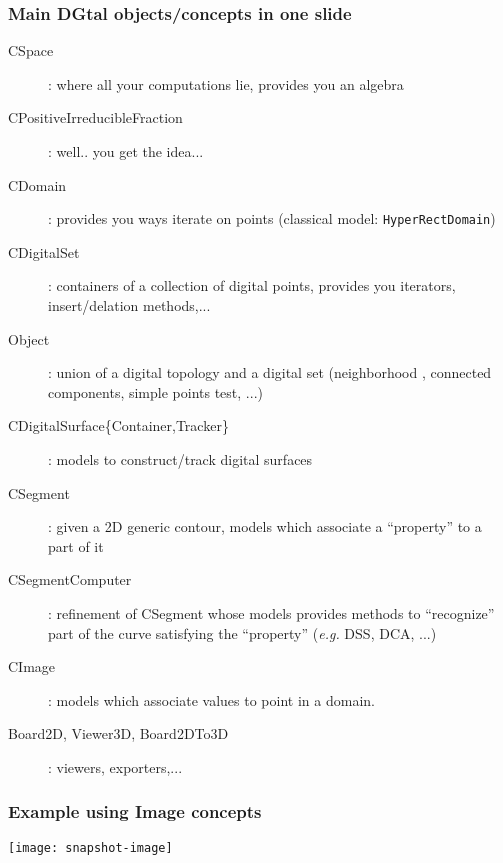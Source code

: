 \documentclass[8pt]{beamer}
\begin{document}
\begin{frame}
  \frametitle{Main DGtal objects/concepts in one slide}

  \begin{description}
    \item[CSpace]: where all your computations lie, provides you an algebra 

    \item[CPositiveIrreducibleFraction]: well.. you get the idea...

    \item[CDomain]:  provides you ways iterate on points (classical
      model: \texttt{HyperRectDomain}) 
    \item[CDigitalSet]: containers of a collection of digital points,
      provides you iterators, insert/delation methods,...

    \item[Object]: union of  a digital topology and a digital set
      (neighborhood , connected components, simple points test, ...)

    \item[CDigitalSurface\{Container,Tracker\}]: models to
      construct/track  digital surfaces 

\vspace{0.5cm}

    \item[CSegment]: given a 2D generic contour, models which
      associate a ``property'' to a part of it

    \item[CSegmentComputer]: refinement of CSegment whose models
      provides methods to ``recognize'' part of the curve satisfying
      the ``property'' (\emph{e.g.} DSS, DCA, ...)

\vspace{0.5cm}

    \item[CImage]: models which associate values to point in a
      domain. 

\vspace{0.5cm}

    \item[Board2D, Viewer3D, Board2DTo3D]: viewers, exporters,...

  \end{description}

\end{frame}

\begin{frame}
\frametitle{Example using Image concepts}
  \centering \texttt{[image: snapshot-image]}
\end{frame}
\end{document}
